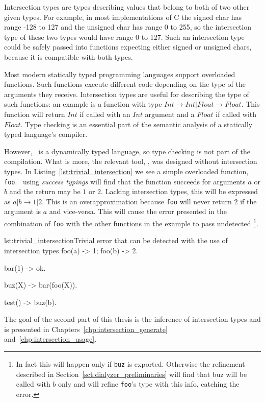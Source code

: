 Intersection types are types describing values that belong to both of
two other given types. For example, in most implementations of C the
signed char has range -128 to 127 and the unsigned char has range 0 to
255, so the intersection type of these two types would have range 0 to
127. Such an intersection type could be safely passed into functions
expecting either signed or unsigned chars, because it is compatible
with both types.

Most modern statically typed programming languages support overloaded
functions. Such functions execute different code depending on the type
of the arguments they receive. Intersection types are useful for
describing the type of such functions: an example is a function with
type $ Int \rightarrow Int | Float \rightarrow Float $. This function
will return $Int$ if called with an $Int$ argument and a $Float$ if
called with $Float$. Type checking is an essential part of the
semantic analysis of a statically typed language's compiler.

However, \er\ is a dynamically typed language, so type checking is not
part of the compilation. What is more, the relevant tool, \dr, was
designed without intersection types. In
Listing~\ref{lst:trivial_intersection} we see a simple overloaded
function, \texttt{foo}. \dr\ using \emph{success typings} will find
that the function succeeds for arguments $a$ or $b$ and the return may
be $1$ or $2$. Lacking intersection types, this will be expressed as
$a | b \rightarrow 1 | 2 $. This is an overapproximation because
\texttt{foo} will never return 2 if the argument is $a$ and
vice-versa. This will cause the error presented in the combination of
\texttt{foo} with the other functions in the example to pass
undetected \footnote{In fact this will happen only if \texttt{buz} is
  exported. Otherwise the refinement described in
  Section~\ref{sct:dialyzer_preliminaries} will find that buz will be
  called with $b$ only and will refine \texttt{foo}'s type with this
  info, catching the error.}.

\begin{console}{lst:trivial_intersection}{Trivial error that can be detected with the use of intersection types}
  foo(a) -> 1;
  foo(b) -> 2.

  bar(1) -> ok.

  buz(X) ->
    bar(foo(X)).

  test() ->
    buz(b).
\end{console}

The goal of the second part of this thesis is the inference of
intersection types and is presented in
Chapters~\ref{chp:intersection_generate}
and~\ref{chp:intersection_usage}.
